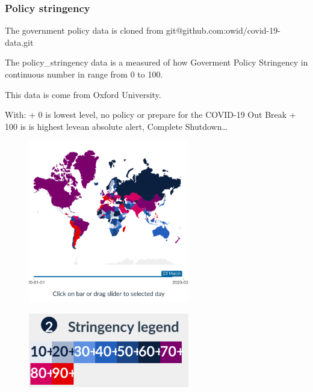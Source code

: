 \documentclass[a4paper]{article}
\begin{document}
    \hypertarget{policy_stringency}{%
\subsubsection{Policy stringency}\label{policy_stringency}}

    The government policy data is cloned from
git@github.com:owid/covid-19-data.git

The policy\_stringency data is a measured of how Goverment Policy
Stringency in continuous number in range from 0 to 100.

This data is come from Oxford University.

With: + 0 is lowest level, no policy or prepare for the COVID-19 Out
Break + 100 is is highest levean absolute alert, Complete
Shutdown\ldots{}

\begin{figure}[ht]
\centering
\includegraphics[width= 7cm]{Images/image_720.png}
\end{figure}
\begin{figure}[ht]
\centering
\includegraphics[width= 7cm]{Images/image.png}
\end{figure}
\end{document}
